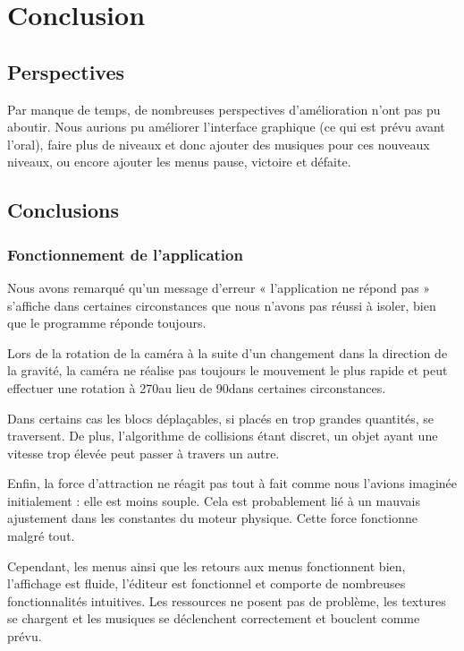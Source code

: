 \chapter{Conclusion}

\section{Perspectives}
Par manque de temps, de nombreuses perspectives d'amélioration n'ont pas pu
aboutir. Nous aurions pu améliorer l'interface graphique (ce qui est prévu
avant l'oral), faire plus de niveaux et donc ajouter des musiques pour ces
nouveaux niveaux, ou encore ajouter les menus pause, victoire et défaite.

\section{Conclusions}

\subsection{Fonctionnement de l'application}

Nous avons remarqué qu'un message d'erreur « l'application ne répond pas »
s'affiche dans certaines circonstances que nous n'avons pas réussi à isoler,
bien que le programme réponde toujours.

Lors de la rotation de la caméra à la suite d'un changement dans la direction
de la gravité, la caméra ne réalise pas toujours le mouvement le plus rapide
et peut effectuer une rotation à 270\degree au lieu de 90\degree dans certaines
circonstances.

Dans certains cas les blocs déplaçables, si placés en trop grandes quantités,
se traversent. De plus, l'algorithme de collisions étant discret, un objet
ayant une vitesse trop élevée peut passer à travers un autre.

Enfin, la force d'attraction ne réagit pas tout à fait comme nous l'avions
imaginée initialement : elle est moins souple. Cela est probablement lié
à un mauvais ajustement dans les constantes du moteur physique. Cette
force fonctionne malgré tout.

Cependant, les menus ainsi que les retours aux menus fonctionnent bien,
l'affichage est fluide, l'éditeur est fonctionnel et comporte de nombreuses
fonctionnalités intuitives. Les ressources ne posent pas de problème,
les textures se chargent et les musiques se déclenchent correctement
et bouclent comme prévu.

